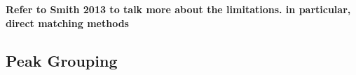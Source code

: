 \textbf{Refer to Smith 2013 to talk more about the limitations. in particular, direct matching methods}

\subsection{Peak Grouping\label{sub:grouping-background}}

